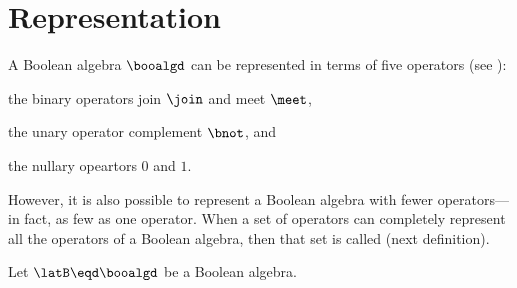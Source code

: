 \section{Representation}
A Boolean algebra $\booalgd$ can be represented in terms of
five operators (see ):
\begin{liste}
  \item the binary operators join $\join$ and meet $\meet$,
  \item the unary operator complement $\bnot$, and
  \item the nullary opeartors $0$ and $1$.
\end{liste}
However, it is also possible to represent a Boolean algebra with fewer operators---
in fact, as few as one operator.
When a set of operators can completely represent all the operators of a Boolean algebra,
then that set is called  (next definition).
\begin{definition}
\label{def:ba_fcomplete}
Let $\latB\eqd\booalgd$ be a Boolean algebra.
\end{definition}

